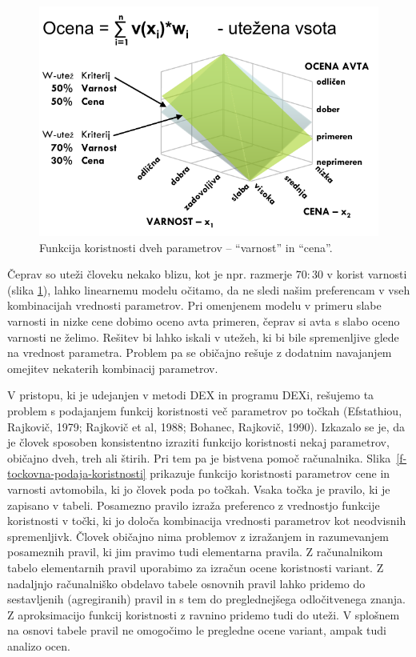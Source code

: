 \begin{figure}[htbp]
\begin{center}
\includegraphics[width=12cm]{slike/ocena-avta.pdf}
\caption{Funkcija koristnosti dveh parametrov – ``varnost'' in ``cena''.}
\label{f-ocena-avta}
\end{center}
\end{figure}
 
Čeprav so uteži človeku nekako blizu, kot je npr. razmerje $70 : 30$ v korist varnosti (slika \ref{f-ocena-avta}), lahko linearnemu modelu očitamo, da ne sledi našim preferencam  v vseh kombinacijah vrednosti parametrov. Pri omenjenem modelu v primeru slabe varnosti in nizke cene dobimo oceno avta primeren, čeprav si avta s slabo oceno varnosti ne želimo. Rešitev bi lahko iskali v utežeh, ki bi bile spremenljive glede na vrednost parametra. Problem pa se običajno rešuje z dodatnim navajanjem omejitev nekaterih kombinacij parametrov.

V pristopu, ki je udejanjen v metodi DEX in programu DEXi, rešujemo ta problem s podajanjem funkcij koristnosti več parametrov po točkah (Efstathiou, Rajkovič, 1979; Rajkovič et al, 1988; Bohanec, Rajkovič, 1990). Izkazalo se je, da je človek sposoben konsistentno izraziti funkcijo koristnosti nekaj parametrov, običajno dveh, treh ali štirih. Pri tem pa je bistvena pomoč računalnika. Slika~\ref{f-tockovna-podaja-koristnosti} prikazuje funkcijo koristnosti parametrov cene in varnosti avtomobila, ki jo človek poda po točkah. Vsaka točka je pravilo, ki je zapisano v tabeli. Posamezno pravilo izraža preferenco z vrednostjo funkcije koristnosti v točki, ki jo določa kombinacija vrednosti parametrov kot neodvisnih spremenljivk. Človek običajno nima problemov z izražanjem in razumevanjem posameznih pravil, ki jim pravimo tudi elementarna pravila. Z računalnikom tabelo elementarnih pravil uporabimo za izračun ocene koristnosti variant. Z nadaljnjo računalniško obdelavo tabele osnovnih pravil lahko pridemo do sestavljenih (agregiranih) pravil in s tem do preglednejšega odločitvenega znanja. Z aproksimacijo funkcij koristnosti z ravnino pridemo tudi do uteži. V splošnem na osnovi tabele pravil ne omogočimo le pregledne ocene variant, ampak tudi analizo ocen.	

